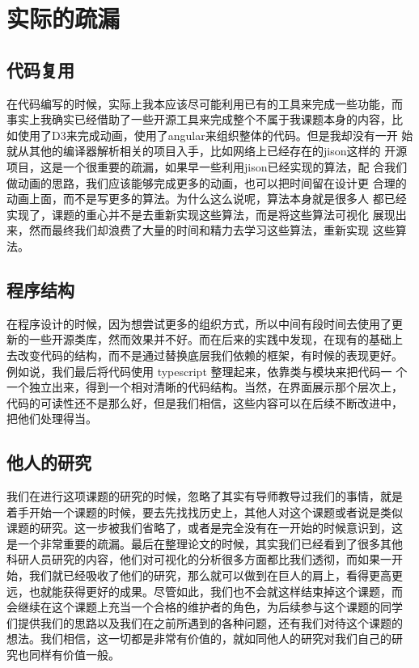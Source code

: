 \section{实际的疏漏}
\subsection{代码复用}
在代码编写的时候，实际上我本应该尽可能利用已有的工具来完成一些功能，而
事实上我确实已经借助了一些开源工具来完成整个不属于我课题本身的内容，比
如使用了D3来完成动画，使用了angular来组织整体的代码。但是我却没有一开
始就从其他的编译器解析相关的项目入手，比如网络上已经存在的jison这样的
开源项目，这是一个很重要的疏漏，如果早一些利用jison已经实现的算法，配
合我们做动画的思路，我们应该能够完成更多的动画，也可以把时间留在设计更
合理的动画上面，而不是写更多的算法。为什么这么说呢，算法本身就是很多人
都已经实现了，课题的重心并不是去重新实现这些算法，而是将这些算法可视化
展现出来，然而最终我们却浪费了大量的时间和精力去学习这些算法，重新实现
这些算法。
\subsection{程序结构}
在程序设计的时候，因为想尝试更多的组织方式，所以中间有段时间去使用了更
新的一些开源类库，然而效果并不好。而在后来的实践中发现，在现有的基础上
去改变代码的结构，而不是通过替换底层我们依赖的框架，有时候的表现更好。
例如说，我们最后将代码使用 typescript 整理起来，依靠类与模块来把代码一
个一个独立出来，得到一个相对清晰的代码结构。当然，在界面展示那个层次上，
代码的可读性还不是那么好，但是我们相信，这些内容可以在后续不断改进中，
把他们处理得当。
\subsection{他人的研究}
我们在进行这项课题的研究的时候，忽略了其实有导师教导过我们的事情，就是
着手开始一个课题的时候，要去先找找历史上，其他人对这个课题或者说是类似
课题的研究。这一步被我们省略了，或者是完全没有在一开始的时候意识到，这
是一个非常重要的疏漏。最后在整理论文的时候，其实我们已经看到了很多其他
科研人员研究的内容，他们对可视化的分析很多方面都比我们透彻，而如果一开
始，我们就已经吸收了他们的研究，那么就可以做到在巨人的肩上，看得更高更
远，也就能获得更好的成果。尽管如此，我们也不会就这样结束掉这个课题，而
会继续在这个课题上充当一个合格的维护者的角色，为后续参与这个课题的同学
们提供我们的思路以及我们在之前所遇到的各种问题，还有我们对待这个课题的
想法。我们相信，这一切都是非常有价值的，就如同他人的研究对我们自己的研
究也同样有价值一般。
